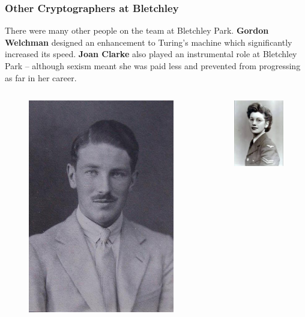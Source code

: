 \documentclass{beamer}
\newcommand{\<}{\langle}
\renewcommand{\>}{\rangle}
\begin{document}
\begin{frame}
\frametitle{Other Cryptographers at Bletchley}
\small
There were many other people on the team at Bletchley Park. \textbf{Gordon Welchman} designed an enhancement to Turing's machine which significantly increased its speed. \textbf{Joan Clarke} also played an instrumental role at Bletchley Park -- although sexism meant she was paid less and prevented from progressing as far in her career.

\begin{columns}
\begin{column}{.5\textwidth}
\begin{figure}
\includegraphics[scale=.2]{IMG/welchman}
\end{figure}
\end{column}
\begin{column}{.5\textwidth}
\begin{figure}
\includegraphics[scale=.5]{IMG/clarke}

\end{figure}
\end{column}
\end{columns}
\end{frame}
\end{document}
